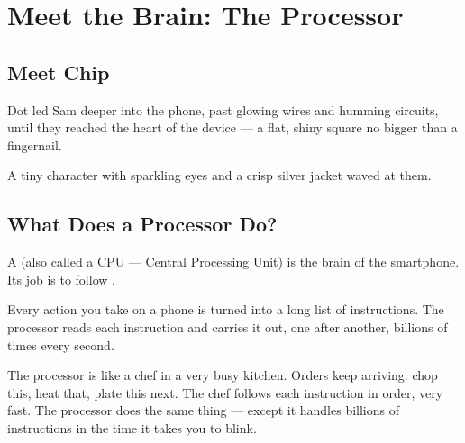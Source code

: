 
\chapter{Meet the Brain: The Processor}


\section*{Meet Chip}

Dot led Sam deeper into the phone, past glowing wires and humming circuits,
until they reached the heart of the device — a flat, shiny square no bigger than a fingernail.

A tiny character with sparkling eyes and a crisp silver jacket waved at them.


\sectionrule

\section*{What Does a Processor Do?}

A  (also called a CPU — Central Processing Unit) is the brain of the smartphone.
Its job is to follow .

Every action you take on a phone is turned into a long list of instructions.
The processor reads each instruction and carries it out, one after another,
billions of times every second.

\begin{picturethis}
  The processor is like a chef in a very busy kitchen.
  Orders keep arriving: chop this, heat that, plate this next.
  The chef follows each instruction in order, very fast.
  The processor does the same thing — except it handles billions
  of instructions in the time it takes you to blink.
\end{picturethis}

